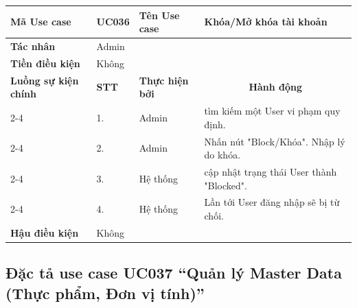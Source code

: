 \documentclass[../main.tex]{subfiles}
\begin{document}
\begin{longtable}{|p{2.7cm}|p{0.8cm}|p{2.6cm}|p{7.3cm}|}
\hline
\cellcolor[HTML]{D5F5E3}\textbf{Mã Use case} & \multicolumn{1}{l|}{UC036} & \cellcolor[HTML]{D5F5E3}\textbf{Tên Use case} & Khóa/Mở khóa tài khoản \\ \hline
\cellcolor[HTML]{D5F5E3}\textbf{Tác nhân} & \multicolumn{3}{p{10.7cm}|}{Admin} \\ \hline
\cellcolor[HTML]{D5F5E3}\textbf{Tiền điều kiện} & \multicolumn{3}{p{10.7cm}|}{Không} \\ \hline

\cellcolor[HTML]{D5F5E3}\textbf{Luồng sự kiện chính} & \cellcolor[HTML]{FDEBD0}\textbf{STT} & \cellcolor[HTML]{FDEBD0}\textbf{Thực hiện bởi} & \multicolumn{1}{c|}{\cellcolor[HTML]{FDEBD0}\textbf{Hành động}} \\ \cline{2-4} 
\cellcolor[HTML]{D5F5E3} & 1. & Admin & tìm kiếm một User vi phạm quy định. \\ \cline{2-4} 
\cellcolor[HTML]{D5F5E3} & 2. & Admin & Nhấn nút "Block/Khóa". Nhập lý do khóa. \\ \cline{2-4} 
\cellcolor[HTML]{D5F5E3} & 3. & Hệ thống & cập nhật trạng thái User thành "Blocked". \\ \cline{2-4} 
\cellcolor[HTML]{D5F5E3} & 4. & Hệ thống & Lần tới User đăng nhập sẽ bị từ chối. \\ \hline

\cellcolor[HTML]{D5F5E3}\textbf{Hậu điều kiện} & \multicolumn{3}{p{10.7cm}|}{Không} \\ \hline
\end{longtable}
\endgroup

\subsection{Đặc tả use case UC037 ``Quản lý Master Data (Thực phẩm, Đơn vị tính)''}
\vspace{0.5cm}

\begingroup
\renewcommand{\arraystretch}{1.5}
\end{document}

